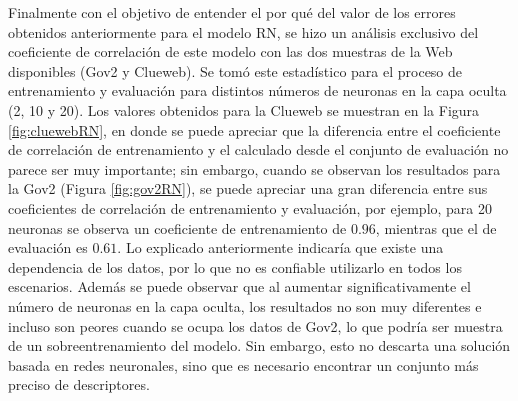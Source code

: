 Finalmente con el objetivo de entender el por qué del valor de los errores obtenidos anteriormente para el modelo RN, se hizo un análisis exclusivo del coeficiente de correlación de este modelo con las dos muestras de la Web disponibles (Gov2 y Clueweb). Se tomó este estadístico para el proceso de entrenamiento y evaluación para distintos números de neuronas en la capa oculta (2, 10 y 20). Los valores obtenidos para la Clueweb se muestran en la Figura \ref{fig:cluewebRN}, en donde se puede apreciar que la diferencia entre el coeficiente de correlación de entrenamiento y el calculado desde el conjunto de evaluación no parece ser muy importante; sin embargo, cuando se observan los resultados para la Gov2 (Figura \ref{fig:gov2RN}), se puede apreciar una gran diferencia entre sus coeficientes de correlación de entrenamiento y evaluación, por ejemplo, para 20 neuronas se observa un coeficiente de entrenamiento de $0.96$, mientras que el de evaluación es $0.61$. Lo explicado anteriormente indicaría que existe una dependencia de los datos, por lo que no es confiable utilizarlo en todos los escenarios. Además se puede observar que al aumentar significativamente el número de neuronas en la capa oculta, los resultados no son muy diferentes e incluso son peores cuando se ocupa los datos de Gov2, lo que podría ser muestra de un sobreentrenamiento del modelo. Sin embargo, esto no descarta una solución basada en redes neuronales, sino que es necesario encontrar un conjunto más preciso de descriptores.

